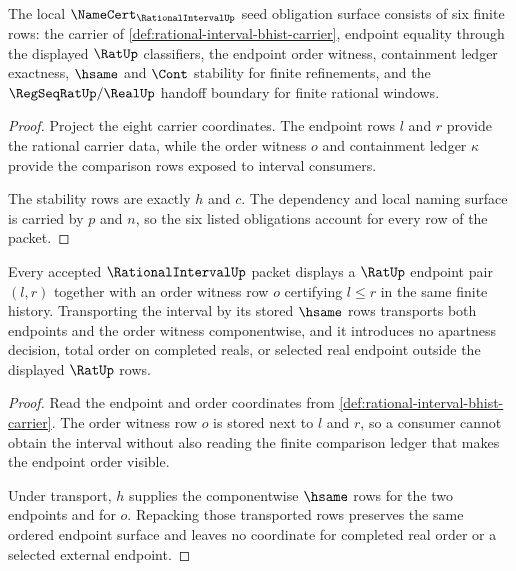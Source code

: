 \begin{theorem}
\label{thm:rational-interval-namecert-obligation-surface}
The local $\NameCert_{\RationalIntervalUp}$ seed obligation surface consists
of six finite rows: the carrier of
\autoref{def:rational-interval-bhist-carrier}, endpoint equality through the
displayed $\RatUp$ classifiers, the endpoint order witness, containment
ledger exactness, $\hsame$ and $\Cont$ stability for finite refinements, and
the $\RegSeqRatUp/\RealUp$ handoff boundary for finite rational windows.
\end{theorem}
\begin{proof}
Project the eight carrier coordinates. The endpoint rows $l$ and $r$ provide
the rational carrier data, while the order witness $o$ and containment ledger
$\kappa$ provide the comparison rows exposed to interval consumers.

The stability rows are exactly $h$ and $c$. The dependency and local naming
surface is carried by $p$ and $n$, so the six listed obligations account for
every row of the packet.
\end{proof}

\begin{theorem}
\label{thm:rational-interval-endpoint-order-witness}
Every accepted $\RationalIntervalUp$ packet displays a $\RatUp$ endpoint pair
$(l,r)$ together with an order witness row $o$ certifying $l \leq r$ in the
same finite history. Transporting the interval by its stored $\hsame$ rows
transports both endpoints and the order witness componentwise, and it
introduces no apartness decision, total order on completed reals, or selected
real endpoint outside the displayed $\RatUp$ rows.
\end{theorem}
\begin{proof}
Read the endpoint and order coordinates from
\autoref{def:rational-interval-bhist-carrier}. The order witness row $o$ is
stored next to $l$ and $r$, so a consumer cannot obtain the interval without
also reading the finite comparison ledger that makes the endpoint order
visible.

Under transport, $h$ supplies the componentwise $\hsame$ rows for the two
endpoints and for $o$. Repacking those transported rows preserves the same
ordered endpoint surface and leaves no coordinate for completed real order
or a selected external endpoint.
\end{proof}

